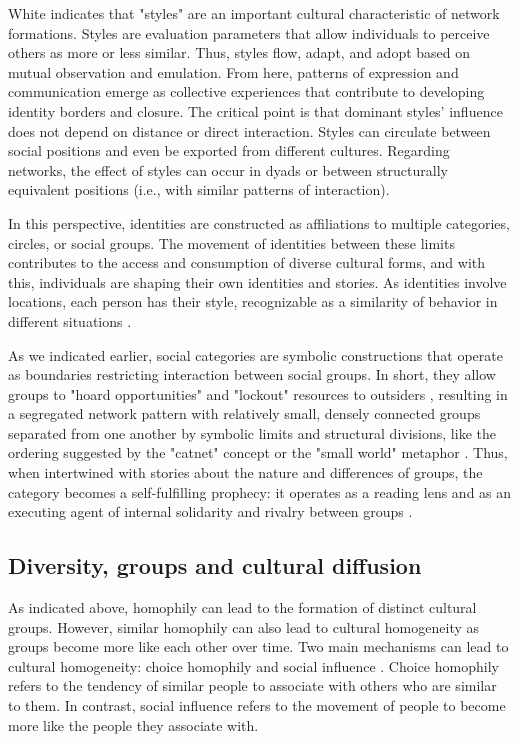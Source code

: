 White \parencite*{white_identity_2008} indicates that "styles" are an important cultural characteristic of network formations. Styles are evaluation parameters that allow individuals to perceive others as more or less similar. Thus, styles flow, adapt, and adopt based on mutual observation and emulation. From here, patterns of expression and communication emerge as collective experiences that contribute to developing identity borders and closure. The critical point is that dominant styles' influence does not depend on distance or direct interaction. Styles can circulate between social positions and even be exported from different cultures. Regarding networks, the effect of styles can occur in dyads or between structurally equivalent positions (i.e., with similar patterns of interaction).
\bigskip

In this perspective, identities are constructed as affiliations to multiple categories, circles, or social groups. The movement of identities between these limits contributes to the access and consumption of diverse cultural forms, and with this, individuals are shaping their own identities and stories. As identities involve locations, each person has their style, recognizable as a similarity of behavior in different situations \parencite{watts_identity_2002}.
\bigskip

As we indicated earlier, social categories are symbolic constructions that operate as boundaries restricting interaction between social groups. In short, they allow groups to "hoard opportunities" and "lockout" resources to outsiders \parencite{tilly_durable_2009}, resulting in a segregated network pattern with relatively small, densely connected groups separated from one another by symbolic limits and structural divisions, like the ordering suggested by the "catnet" concept or the "small world" metaphor \parencite{watts_collective_1998}. Thus, when intertwined with stories about the nature and differences of groups, the category becomes a self-fulfilling prophecy: it operates as a reading lens and as an executing agent of internal solidarity and rivalry between groups \parencite{fuhse_theorizing_2015}.

\subsection{Diversity, groups and cultural diffusion}

As indicated above, homophily can lead to the formation of distinct cultural groups. However, similar homophily can also lead to cultural homogeneity as groups become more like each other over time. Two main mechanisms can lead to cultural homogeneity: choice homophily and social influence \parencite{centola_homophily_2007}. Choice homophily refers to the tendency of similar people to associate with others who are similar to them. In contrast, social influence refers to the movement of people to become more like the people they associate with.
\bigskip

